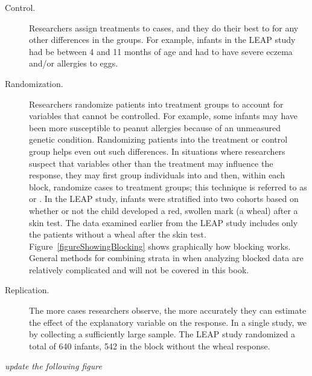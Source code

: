 \begin{doublespace}

\begin{description}

	\item[Control.] Researchers assign treatments to cases, and they do their best to  for any other differences in the groups.  For example, infants in the LEAP study had be between 4 and 11 months of age and had to have severe eczema and/or allergies to eggs.  

	\item[Randomization.] Researchers randomize patients into treatment groups to account for variables that cannot be controlled. For example, some infants may have been more susceptible to peanut allergies because of an unmeasured genetic condition. Randomizing patients into the treatment or control group helps even out such differences. In situations where researchers suspect that variables other than the treatment may influence the response, they may first group individuals into  and then, within each block, randomize cases to treatment groups; this technique is referred to as  or .  In the LEAP study, infants were stratified into two cohorts based on whether or not the child developed a red, swollen mark (a wheal) after a skin test.  The data examined earlier from the LEAP study includes only the patients without a wheal after the skin test. Figure~\ref{figureShowingBlocking} shows graphically how blocking works. General methods for combining strata in when analyzing blocked data are relatively complicated and will not be covered in this book.

	\item[Replication.] The more cases researchers observe, the more accurately they can estimate the effect of the explanatory variable on the response. In a single study, we  by collecting a sufficiently large sample.  The LEAP study randomized a total of 640 infants, 542 in the block without the wheal response.

\end{description}
	

\textit{update the following figure}


\end{doublespace}
